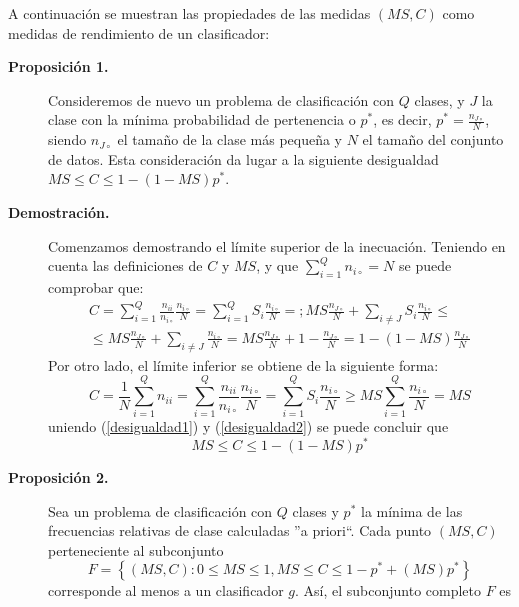 A continuación se muestran las propiedades de las medidas $(MS,C)$ como medidas de rendimiento de
un clasificador:
\begin{description}
\item[\textbf{Proposición 1.}] Consideremos de nuevo un problema de clasificación con $Q$
clases, y $J$ la clase con la mínima probabilidad de pertenencia o $p^{*}$, es
decir, $p^{*}=\frac{n_{J\circ}}{N}$, siendo $n_{J\circ}$ el tamaño de la clase
más pequeña y $N$ el tamaño del conjunto de datos. Esta consideración da lugar a la
siguiente desigualdad $MS\leq C\leq 1- \left(1-MS \right) p^{*}$.
\item[\textbf{Demostración.}] Comenzamos demostrando el límite superior de la
inecuación. Teniendo en cuenta
las definiciones de $C$ y $MS$, y que $\displaystyle \sum_{i=1}^Q n_{i\circ}=N$ se puede
comprobar que:
\begin{eqnarray}\label{desigualdad1}
C=\sum_{i=1}^Q \frac{n_{ii}}{n_{i\circ}}\frac{n_{i\circ}}{N}=\sum_{i=1}^Q
S_{i}\frac{n_{i\circ}}{N}=;MS\frac{n_{J\circ}}{N}+\sum_{i\neq
J}S_{i}\frac{n_{i\circ}}{N}\leq\\
\leq MS\frac{n_{J\circ}}{N}+\sum_{i\neq
J}\frac{n_{i\circ}}{N}=MS\frac{n_{J\circ}}{N}+1-\frac{n_{J\circ}}{N}
=1-\left(1-MS\right)\frac{n_{J\circ}}{N}
\nonumber
\end{eqnarray}
Por otro lado, el límite inferior se obtiene de la siguiente forma:
\begin{equation}\label{desigualdad2}
C=\frac{1}{N}\sum_{i=1}^Q n_{ii}=\sum_{i=1}^Q
\frac{n_{ii}}{n_{i\circ}}\frac{n_{i\circ}}{N}=\sum_{i=1}^Q S_{i}\frac{n_{i\circ}}{N}\geq
MS\sum_{i=1}^Q\frac{n_{i\circ}}{N}=MS
\end{equation}
uniendo (\ref{desigualdad1}) y (\ref{desigualdad2}) se puede concluir que
\begin{equation}\label{desigualdad3}
MS\leq C\leq	1-\left(1-MS\right) p^{*}
\end{equation}
\item[\textbf{Proposición 2.}] Sea un problema de clasificación con $Q$ clases y $p^*$ la
mínima de las frecuencias relativas de clase calculadas ''a priori``. Cada punto $(MS,C)$
perteneciente al subconjunto
\begin{displaymath}
		F=\left\lbrace 	(MS,C):0\leq MS\leq 1, MS\leq C\leq 1-p^*+(MS)p^*\right\rbrace
\end{displaymath}
corresponde al menos a un clasificador $g$. Así, el subconjunto completo $F$ es

\end{description}
